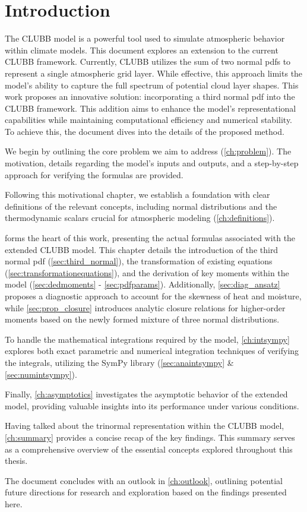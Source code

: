 \chapter{Introduction}\label{ch:introduction}

The \gls{CLUBB} model is a powerful tool used to simulate atmospheric behavior within climate models.
This document explores an extension to the current \gls{CLUBB} framework.
Currently, \gls{CLUBB} utilizes the sum of two normal \glspl{pdf}
to represent a single atmospheric grid layer.
While effective,
this approach limits the model's ability to capture the full spectrum of potential cloud layer shapes.
This work proposes an innovative solution:
incorporating a third normal \gls{pdf} into the \gls{CLUBB} framework.
This addition aims to enhance the model's representational capabilities
while maintaining computational efficiency and numerical stability.
To achieve this, the document dives into the details of the proposed method.

We begin by outlining the core problem we aim to address (\cref{ch:problem}).
The motivation, details regarding the model's inputs and outputs,
and a step-by-step approach for verifying the formulas are provided.

Following this motivational chapter,
we establish a foundation with clear definitions of the relevant concepts,
including normal distributions and the thermodynamic scalars
crucial for atmospheric modeling (\cref{ch:definitions}).

 forms the heart of this work,
presenting the actual formulas associated with the extended \gls{CLUBB} model.
This chapter details the introduction of the third normal \gls{pdf} (\cref{sec:third_normal}),
the transformation of existing equations (\cref{sec:transformationequations}),
and the derivation of key moments within the model (\cref{sec:dedmoments} - \cref{sec:pdfparams}).
Additionally,
\cref{sec:diag_ansatz} proposes a diagnostic approach
to account for the skewness of heat and moisture,
while \cref{sec:prop_closure} introduces analytic closure relations
for higher-order moments based on the newly formed mixture of three normal distributions.

To handle the mathematical integrations required by the model,
\cref{ch:intsympy} explores both exact parametric
and numerical integration techniques of verifying the integrals,
utilizing the SymPy library (\cref{sec:anaintsympy} \& \cref{sec:numintsympy}).

Finally,
\cref{ch:asymptotics} investigates the asymptotic behavior of the extended model,
providing valuable insights into its performance under various conditions.

Having talked about the trinormal representation within the \gls{CLUBB} model,
\cref{ch:summary} provides a concise recap of the key findings.
This summary serves as a comprehensive overview of the essential concepts
explored throughout this thesis.

The document concludes with an outlook in \cref{ch:outlook},
outlining potential future directions for research
and exploration based on the findings presented here.
